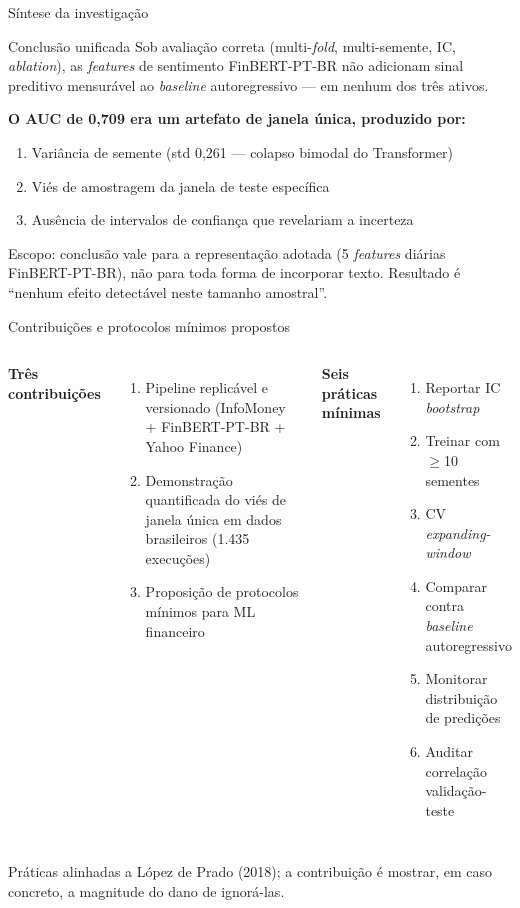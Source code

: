 \documentclass[11pt,aspectratio=169]{beamer}
\begin{document}
\begin{frame}{Síntese da investigação}
  \begin{block}{Conclusão unificada}
    Sob avaliação correta (multi-\textit{fold}, multi-semente, IC, \textit{ablation}),
    as \textit{features} de sentimento FinBERT-PT-BR \alert{não adicionam sinal
    preditivo mensurável} ao \textit{baseline} autoregressivo --- em nenhum
    dos três ativos.
  \end{block}
  \vspace{1ex}
  \textbf{O AUC de 0{,}709 era um artefato de janela única, produzido por:}
  \begin{enumerate}
    \item Variância de semente (std 0{,}261 --- colapso bimodal do Transformer)
    \item Viés de amostragem da janela de teste específica
    \item Ausência de intervalos de confiança que revelariam a incerteza
  \end{enumerate}
  \vspace{1ex}
  \footnotesize Escopo: conclusão vale para a representação adotada (5 \textit{features} diárias FinBERT-PT-BR),
  não para toda forma de incorporar texto. Resultado é ``nenhum efeito detectável neste tamanho amostral''.
\end{frame}

\begin{frame}{Contribuições e protocolos mínimos propostos}
  \begin{columns}[T]
    \textbf{Três contribuições}
    \begin{enumerate}
      \item Pipeline replicável e versionado (InfoMoney + FinBERT-PT-BR + Yahoo Finance)
      \item Demonstração quantificada do viés de janela única em dados brasileiros (1.435 execuções)
      \item Proposição de protocolos mínimos para ML financeiro
    \end{enumerate}
    \textbf{Seis práticas mínimas}
    \begin{enumerate}
      \item Reportar IC \textit{bootstrap}
      \item Treinar com $\geq$10 sementes
      \item CV \textit{expanding-window}
      \item Comparar contra \textit{baseline} autoregressivo
      \item Monitorar distribuição de predições
      \item Auditar correlação validação-teste
    \end{enumerate}
  \end{columns}
  \vspace{1ex}
  \footnotesize Práticas alinhadas a López de Prado (2018); a contribuição é mostrar,
  em caso concreto, a magnitude do dano de ignorá-las.
\end{frame}
\end{document}
